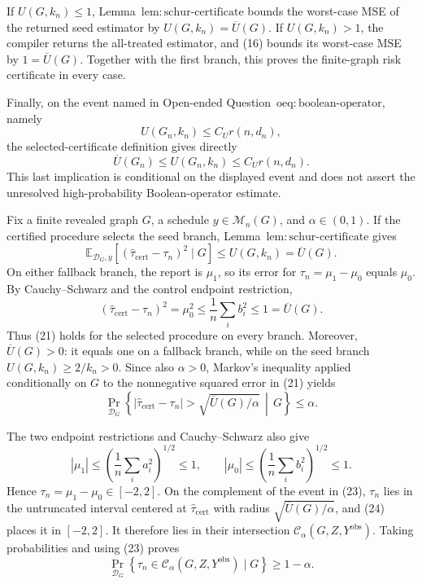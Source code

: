 If \(U(G,k_n)\le1\),
Lemma~\(\mathrm{lem{:}schur\mbox{-}certificate}\) bounds the worst-case MSE
of the returned seed estimator by
\(U(G,k_n)=\overline U(G)\).  If \(U(G,k_n)>1\), the compiler returns the
all-treated estimator, and (16) bounds its worst-case MSE by
\(1=\overline U(G)\).  Together with the first branch, this proves the
finite-graph risk certificate in every case.

Finally, on the event named in
Open-ended Question~\(\mathrm{oeq{:}boolean\mbox{-}operator}\), namely
\[
U(G_n,k_n)\le C_Ur(n,d_n),
\]
the selected-certificate definition gives directly
\[
\overline U(G_n)
\le U(G_n,k_n)
\le C_Ur(n,d_n).
\tag{20}
\]
This last implication is conditional on the displayed event and does not
assert the unresolved high-probability Boolean-operator estimate.

Fix a finite revealed graph \(G\), a schedule
\(y\in\mathcal M_n(G)\), and \(\alpha\in(0,1)\).  If the certified
procedure selects the seed branch, Lemma~\(\mathrm{lem{:}schur\mbox{-}certificate}\)
gives
\[
\mathbb E_{\mathcal D_G,y}
\left[(\widehat\tau_{\mathrm{cert}}-\tau_n)^2\mid G\right]
\le U(G,k_n)=\overline U(G).
\tag{21}
\]
On either fallback branch, the report is \(\mu_1\), so its error for
\(\tau_n=\mu_1-\mu_0\) equals \(\mu_0\).  By Cauchy--Schwarz and the
control endpoint restriction,
\[
(\widehat\tau_{\mathrm{cert}}-\tau_n)^2
=\mu_0^2
\le\frac1n\sum_i b_i^2
\le1=\overline U(G).
\tag{22}
\]
Thus (21) holds for the selected procedure on every branch.  Moreover,
\(\overline U(G)>0\): it equals one on a fallback branch, while on the seed
branch \(U(G,k_n)\ge2/k_n>0\).  Since also \(\alpha>0\), Markov's
inequality applied conditionally on \(G\) to the nonnegative squared error
in (21) yields
\[
\Pr_{\mathcal D_G}\!\left\{
|\widehat\tau_{\mathrm{cert}}-\tau_n|
>\sqrt{\overline U(G)/\alpha}
\,\middle|\,G\right\}
\le\alpha.
\tag{23}
\]

The two endpoint restrictions and Cauchy--Schwarz also give
\[
|\mu_1|\le
\left(\frac1n\sum_i a_i^2\right)^{1/2}\le1,
\qquad
|\mu_0|\le
\left(\frac1n\sum_i b_i^2\right)^{1/2}\le1.
\tag{24}
\]
Hence \(\tau_n=\mu_1-\mu_0\in[-2,2]\).  On the complement of the event
in (23), \(\tau_n\) lies in the untruncated interval centered at
\(\widehat\tau_{\mathrm{cert}}\) with radius
\(\sqrt{\overline U(G)/\alpha}\), and (24) places it in \([-2,2]\).
It therefore lies in their intersection
\(\mathcal C_\alpha(G,Z,Y^{\mathrm{obs}})\).  Taking probabilities and
using (23) proves
\[
\Pr_{\mathcal D_G}\!\left\{
\tau_n\in\mathcal C_\alpha(G,Z,Y^{\mathrm{obs}})\mid G
\right\}\ge1-\alpha.
\]
